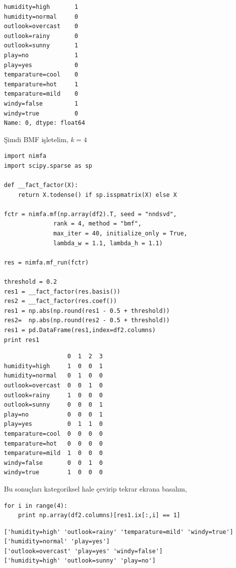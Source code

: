 \documentclass[12pt,fleqn]{article}\usepackage{../../common}
\begin{document}
\begin{verbatim}
humidity=high       1
humidity=normal     0
outlook=overcast    0
outlook=rainy       0
outlook=sunny       1
play=no             1
play=yes            0
temparature=cool    0
temparature=hot     1
temparature=mild    0
windy=false         1
windy=true          0
Name: 0, dtype: float64
\end{verbatim}

Şimdi BMF işletelim, $k=4$

\begin{verbatim}
import nimfa
import scipy.sparse as sp

def __fact_factor(X):
    return X.todense() if sp.isspmatrix(X) else X

fctr = nimfa.mf(np.array(df2).T, seed = "nndsvd", 
              rank = 4, method = "bmf", 
              max_iter = 40, initialize_only = True,
              lambda_w = 1.1, lambda_h = 1.1)

res = nimfa.mf_run(fctr)

threshold = 0.2
res1 = __fact_factor(res.basis())
res2 = __fact_factor(res.coef())
res1 = np.abs(np.round(res1 - 0.5 + threshold))
res2=  np.abs(np.round(res2 - 0.5 + threshold))
res1 = pd.DataFrame(res1,index=df2.columns)
print res1
\end{verbatim}

\begin{verbatim}
                  0  1  2  3
humidity=high     1  0  0  1
humidity=normal   0  1  0  0
outlook=overcast  0  0  1  0
outlook=rainy     1  0  0  0
outlook=sunny     0  0  0  1
play=no           0  0  0  1
play=yes          0  1  1  0
temparature=cool  0  0  0  0
temparature=hot   0  0  0  0
temparature=mild  1  0  0  0
windy=false       0  0  1  0
windy=true        1  0  0  0
\end{verbatim}

Bu sonuçları kategoriksel hale çevirip tekrar ekrana basalım,

\begin{verbatim}
for i in range(4):
    print np.array(df2.columns)[res1.ix[:,i] == 1]
\end{verbatim}

\begin{verbatim}
['humidity=high' 'outlook=rainy' 'temparature=mild' 'windy=true']
['humidity=normal' 'play=yes']
['outlook=overcast' 'play=yes' 'windy=false']
['humidity=high' 'outlook=sunny' 'play=no']
\end{verbatim}
\end{document}

